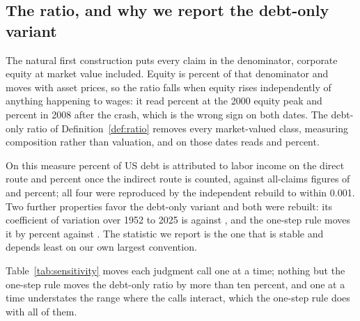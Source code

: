 \subsection{The ratio, and why we report the debt-only variant}

The natural first construction puts every claim in the denominator, corporate equity at market
value included. Equity is  percent of that denominator and moves with
asset prices, so the ratio falls when equity rises independently of anything happening to wages: it
read  percent at the 2000 equity peak and  percent in
2008 after the crash, which is the wrong sign on both dates. The debt-only ratio of
Definition~\ref{def:ratio} removes every market-valued class, measuring composition rather than
valuation, and on those dates reads  and  percent.

On this measure  percent of US debt is attributed to labor income on the
direct route and  percent once the indirect route is counted, against
all-claims figures of  and  percent; all four were reproduced by the
independent rebuild to within 0.001. Two further properties favor the debt-only variant and both
were rebuilt: its coefficient of variation over 1952 to 2025 is  against
, and the one-step rule moves it by  percent against
. The statistic we report is the one that is stable and depends
least on our own largest convention.

Table~\ref{tab:sensitivity} moves each judgment call one at a time; nothing but the one-step rule
moves the debt-only ratio by more than ten percent, and one at a time understates the range where
the calls interact, which the one-step rule does with all of them.

\begin{table}[htbp]
\centering
\caption{Sensitivity of the debt-only labor backing ratio, one judgment call at a time.
Computed on the coverage construction, which is the basis these sensitivities were built and
rebuilt against; the moves, not the levels, are what the table reports. Measured, rebuilt.}
\label{tab:sensitivity}

\end{table}

